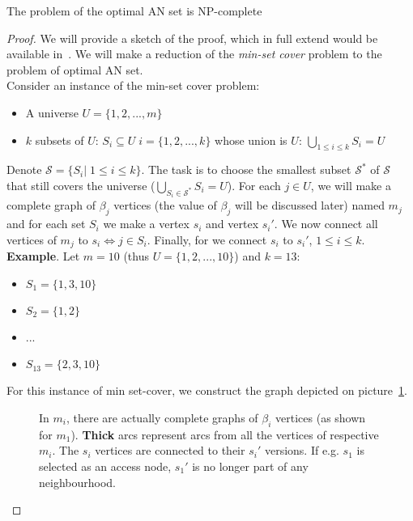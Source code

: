 \documentclass{svk_long_en}
\newcommand{\inputTikZ}[1]{%
    \beginpgfgraphicnamed{#1-external}%
    \endpgfgraphicnamed%
}
\begin{document}
		\begin{theorem}
			The problem of the optimal AN set is NP-complete
		\end{theorem}
		\begin{proof}
			We will provide a sketch of the proof, which in full extend would be available in~\cite{dottg13}. We will make a reduction of the \textit{min-set cover} problem to the problem of optimal AN set. \\
			
			\noindent Consider an instance of the min-set cover problem:
			\begin{itemize}
				\item A universe $U = \{1, 2, ..., m\}$
				\item $k$ subsets of $U$: $S_{i} \subseteq U \; i = \{1, 2, ..., k\}$ whose union is $U$: $\bigcup\limits_{1 \leq i \leq k} S_{i} = U$
			\end{itemize}
			\hspace*{\fill}
			
			\noindent Denote $\mathcal{S} = \{S_{i}| \; 1 \leq i \leq k\}$. The task is to choose the smallest subset $\mathcal{S}^{*}$ of $\mathcal{S}$ that still covers the universe ($\bigcup\limits_{S_{i} \in \mathcal{S}^{*}} S_{i} = U$). For each $j \in U$, we will make a complete graph of $\beta_{j}$ vertices (the value of $\beta_{j}$ will be discussed later) named $m_{j}$ and for each set $S_{i}$ we make a vertex $s_{i}$ and vertex $s_{i}'$. We now connect all vertices of $m_{j}$ to $s_{i} \iff j \in S_{i}$. Finally, for we connect $s_{i}$ to $s_{i}'$, $1 \leq i \leq k$. \\
			 
			\noindent \textbf{Example}. Let $m = 10$ (thus $U = \{1, 2, ..., 10\}$) and $k = 13$:
			\begin{itemize}
				\item $S_{1} = \{1, 3, 10\}$
			 	\item $S_{2} = \{1, 2\}$
			 	\item ...
			 	\item $S_{13} = \{2, 3, 10\}$
			\end{itemize}
			\hspace*{\fill}
			 
			\noindent For this instance of min set-cover, we construct the graph depicted on picture~\ref{fig:reduction}. \\
			 
			\begin{figure}[h!]
				\begin{center}
					\inputTikZ{./tikzpics/reduction}
				\end{center}
				\caption{\label{fig:reduction} In $m_{i}$, there are actually complete graphs of $\beta_{i}$ vertices (as shown for $m_{1}$). \textbf{Thick} arcs represent arcs from all the vertices of respective $m_{i}$. The $s_{i}$ vertices are connected to their $s_{i}'$ versions. If e.g. $s_{1}$ is selected as an access node, $s_{1}'$ is no longer part of any neighbourhood.}
			\end{figure}
			

\end{proof}
\end{document}
